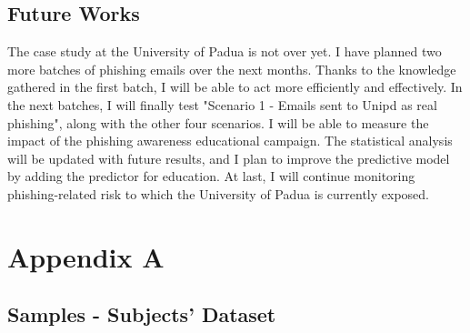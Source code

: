 \documentclass[a4paper]{article}
\begin{document}
\subsection{Future Works}

The case study at the University of Padua is not over yet. I have planned two more batches of phishing emails over the next months. Thanks to the knowledge gathered in the first batch, I will be able to act more efficiently and effectively. In the next batches, I will finally test "Scenario 1 - Emails sent to Unipd as real phishing", along with the other four scenarios. I will be able to measure the impact of the phishing awareness educational campaign. The statistical analysis will be updated with future results, and I plan to improve the predictive model by adding the predictor for education. At last, I will continue monitoring phishing-related risk to which the University of Padua is currently exposed.



\newpage

\section*{Appendix A} \hypertarget{appendix-samples}{}

\subsection*{Samples - Subjects' Dataset} \hypertarget{appendix-samples-dataset}{}
\end{document}
